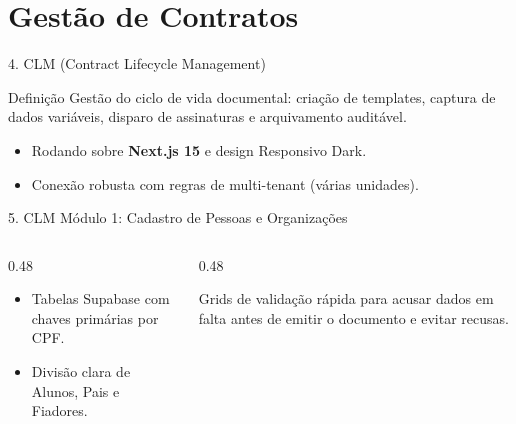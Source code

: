 \documentclass[10pt, aspectratio=169]{beamer}
\begin{document}
\section{Gestão de Contratos}

\begin{frame}{4. CLM (Contract Lifecycle Management)}
    \begin{alertblock}{Definição}
        Gestão do ciclo de vida documental: criação de templates, captura de dados variáveis, disparo de assinaturas e arquivamento auditável.
    \end{alertblock}
    \vspace{0.3cm}
    \begin{itemize}
        \item Rodando sobre \textbf{Next.js 15} e design Responsivo Dark.
        \item Conexão robusta com regras de multi-tenant (várias unidades).
    \end{itemize}
\end{frame}

\begin{frame}{5. CLM Módulo 1: Cadastro de Pessoas e Organizações}
    \begin{columns}[onlytextwidth]
        \begin{column}{0.48\textwidth}
            \begin{tcolorbox}[enhanced,title=Normalização de Bancos,colback=black!30,colframe=ArkosGreen,fonttitle=\bfseries]
                \begin{itemize}
                    \item Tabelas Supabase com chaves primárias por CPF.
                    \item Divisão clara de Alunos, Pais e Fiadores.
                \end{itemize}
            \end{tcolorbox}
        \end{column}
        \begin{column}{0.48\textwidth}
            \begin{tcolorbox}[enhanced,title=Visão de Dashboard,colback=black!30,colframe=cyan,fonttitle=\bfseries]
                Grids de validação rápida para acusar dados em falta antes de emitir o documento e evitar recusas.
            \end{tcolorbox}
        \end{column}
    \end{columns}
\end{frame}
\end{document}
